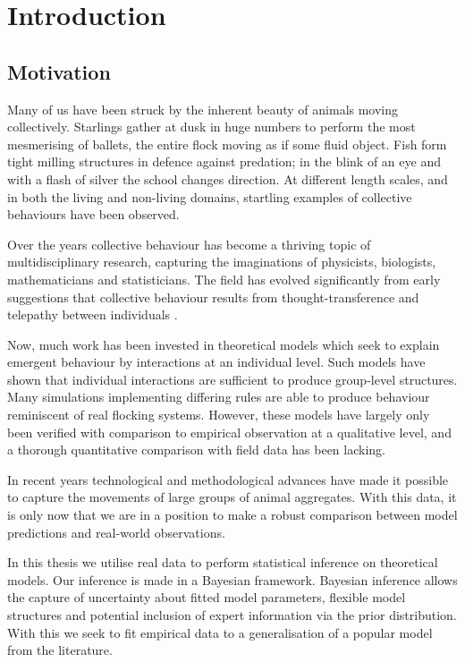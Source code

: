\chapter{Introduction}
\label{cha:introduction}

\section{Motivation}
\label{sec:motivation}

Many of us have been struck by the inherent beauty of animals moving collectively. Starlings gather at dusk in huge numbers to perform the most mesmerising of ballets, the entire flock moving as if some fluid object. Fish form tight milling structures in defence against predation; in the blink of an eye and with a flash of silver the school changes direction. At different length scales, and in both the living and non-living domains, startling examples of collective behaviours have been observed.

Over the years collective behaviour has become a thriving topic of multidisciplinary research, capturing the imaginations of physicists, biologists, mathematicians and statisticians. The field has evolved significantly from early suggestions that collective behaviour results from thought-transference and telepathy between individuals \citep{selous31}. 

Now, much work has been invested in theoretical models which seek to explain emergent behaviour by interactions at an individual level. Such models have shown that individual interactions are sufficient to produce group-level structures. Many simulations implementing differing rules are able to produce behaviour reminiscent of real flocking systems. However, these models have largely only been verified with comparison to empirical observation at a qualitative level, and a thorough quantitative comparison with field data has been lacking.

In recent years technological and methodological advances have made it possible to capture the movements of large groups of animal aggregates. With this data, it is only now that we are in a position to make a robust comparison between model predictions and real-world observations.

In this thesis we utilise real data to perform statistical inference on theoretical models. Our inference is made in a Bayesian framework. Bayesian inference allows the capture of uncertainty about fitted model parameters, flexible model structures and potential inclusion of expert information via the prior distribution. With this we seek to fit empirical data to a generalisation of a popular model from the literature.

